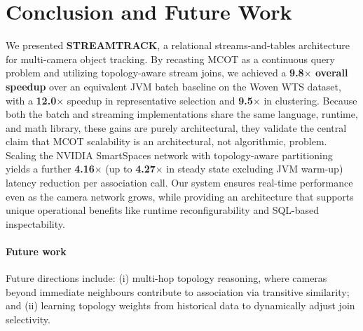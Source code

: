 \documentclass[review]{elsarticle}
\begin{document}
\section{Conclusion and Future Work}\label{sec:conclusion}
We presented \textbf{STREAMTRACK}, a relational streams-and-tables architecture for multi-camera object tracking. By recasting MCOT as a continuous query problem and utilizing topology-aware stream joins, we achieved a \textbf{9.8$\times$ overall speedup} over an equivalent JVM batch baseline on the Woven WTS dataset, with a \textbf{12.0$\times$} speedup in representative selection and \textbf{9.5$\times$} in clustering. Because both the batch and streaming implementations share the same language, runtime, and math library, these gains are purely architectural, they validate the central claim that MCOT scalability is an architectural, not algorithmic, problem. Scaling the NVIDIA SmartSpaces network with topology-aware partitioning yields a further \textbf{4.16$\times$} (up to \textbf{4.27$\times$} in steady state excluding JVM warm-up) latency reduction per association call. Our system ensures real-time performance even as the camera network grows, while providing an architecture that supports unique operational benefits like runtime reconfigurability and SQL-based inspectability.


\paragraph{Future work}
Future directions include: (i) multi-hop topology reasoning, where cameras beyond immediate neighbours contribute to association via transitive similarity; and (ii) learning topology weights from historical data to dynamically adjust join selectivity.

% 


\end{document}
